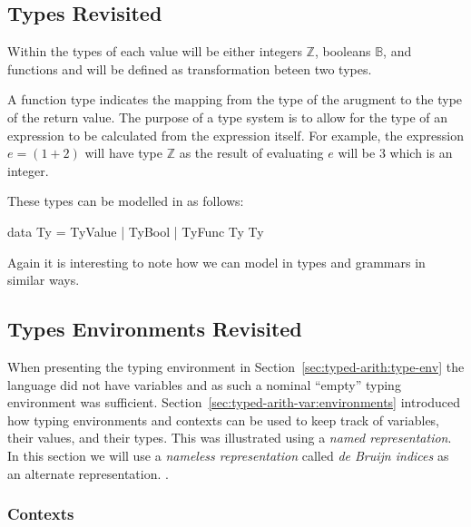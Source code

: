 \subsection{Types Revisited}
\label{sec:lambda:types}

Within \lamlang{} the types of each value will be either integers $\mathbb{Z}$, booleans $\mathbb{B}$, and functions and will be defined as transformation beteen two types.

\begin{bnf}
\end{bnf}

A function type indicates the mapping from the type of the arugment to the type of the return value.
The purpose of a type system is to allow for the type of an expression to be calculated from the expression itself.
For example, the expression $e=(1 + 2)$ will have type $\mathbb{Z}$ as the result of evaluating $e$ will be $3$ which is an integer.

These types can be modelled in \idris{} as follows:

\begin{code}
data Ty = TyValue
        | TyBool
        | TyFunc Ty Ty
\end{code}

\noindent
Again it is interesting to note how we can model in \idris{} types and grammars in similar ways.

\subsection{Types Environments Revisited}
\label{sec:lambda:typing}

When presenting the typing environment in Section~\ref{sec:typed-arith:type-env} the language did not have variables and as such a nominal ``empty'' typing environment was sufficient.
Section~\ref{sec:typed-arith-var:environments} introduced how typing environments  and contexts can be used to keep track of variables, their values, and their types.
This was illustrated using a \emph{named representation}.
In this section we will use a \emph{nameless representation} called \emph{de Bruijn indices} as an alternate representation.
.

\subsubsection{Contexts}
\label{sec:lambda:typing:contexts}

